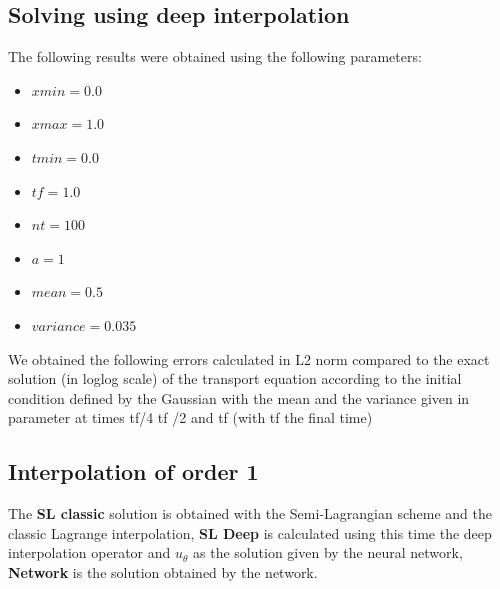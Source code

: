 \documentclass{article}
\begin{document}
\subsection{Solving using deep interpolation}
The following results were obtained using the following parameters:

\begin{itemize}
    \item $xmin = 0.0$
    \item $xmax = 1.0$
    \item $tmin = 0.0$
    \item $tf = 1.0$
    \item $nt = 100$
    \item $a = 1$
    \item $mean = 0.5$
    \item $variance = 0.035$
\end{itemize}

We obtained the following errors calculated in L2 norm compared to the exact solution (in loglog scale) of the transport equation according to the initial condition defined by the Gaussian with the mean and the variance given in parameter at times tf/4 tf /2 and tf (with tf the final time)\\

\subsection{Interpolation of order 1}

The \textbf{SL classic} solution is obtained with the Semi-Lagrangian scheme and the classic Lagrange interpolation, \textbf{SL Deep} is calculated using this time the deep interpolation operator and $u_\theta $ as the solution given by the neural network, \textbf{Network} is the solution obtained by the network.\\
\end{document}

